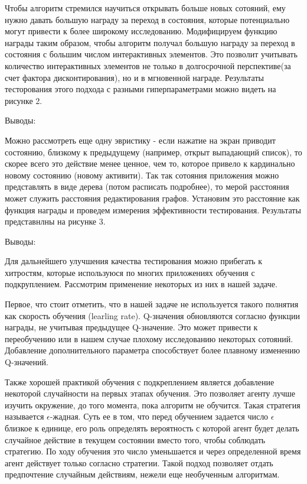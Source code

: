 Чтобы алгоритм стремился научиться открывать больше новых сотояний, ему нужно давать большую награду за переход в состояния, которые потенциально могут привести к более широкому исследованию. Модифицируем функцию награды таким образом, чтобы алгоритм получал большую награду за переход в состояния с большим числом интерактивных элементов. Это позволит учитывать количество интерактивных элементов не только в долгосрочной перспективе(за счет фактора дисконтирования), но и в мгновенной награде. Результаты тесторования этого подхода с разными гиперпараметрами можно видеть на рисунке 2.

Выводы:



Можно рассмотреть еще одну эвристику - если нажатие на экран приводит состоянию, близкому к предыдущему (например, открыт выпадающий список), то скорее всего это действие менее ценное, чем то, которое привело к кардинально новому состоянию (новому активити). Так так сотояния приложения можно представлять в виде дерева (потом расписать подробнее), то мерой расстояния может служить расстояния редактирования графов. Установим это расстояние как функция награды и проведем измерения эффективности тестирования. Результаты представнлны на рисунке 3.

Выводы:

Для дальнейшего улучшения качества тестирования можно прибегать к хитростям, которые используюся по многих приложениях обучения с подкруплением. Рассмотрим применение некоторых из них в нашей задаче.

Первое, что стоит отметить, что в нашей задаче не используется такого полнятия как скорость обучения (learling rate). Q-значения обновляются согласно функции награды, не учитывая предыдущее Q-значение. Это может привести к переобучению или в нашем случае плохому исследованию некоторых сотояний. Добавление дополнительного параметра способствует более плавному изменению Q-значений.

Также хорошей практикой обучения с подкреплением является добавление некоторой случайности на первых этапах обучения. Это позволяет агенту лучше изучить окружение, до того момента, пока алгоритм не обучится. Такая стратегия называется $\epsilon$-жадная. Суть ее в том, что перед обучением задается число $\epsilon$ близкое к единице, его роль определять вероятность с которой агент будет делать случайное действие в текущем состоянии вместо того, чтобы соблюдать стратегию. По ходу обучения это число уменьшается и через определенной время агент действует только согласно стратегии. Такой подход позволяет отдать предпочтение случайным действиям, нежели еще необученным алгоритмам. %

